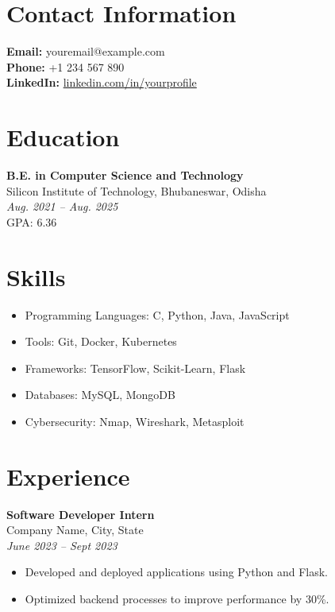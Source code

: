 \documentclass[a4paper,10pt]{article}
\begin{document}
\section*{Contact Information}
\noindent
\textbf{Email:} youremail@example.com \\
\textbf{Phone:} +1 234 567 890 \\
\textbf{LinkedIn:} \href{https://linkedin.com/in/yourprofile}{linkedin.com/in/yourprofile}

\section*{Education}
\noindent
\textbf{B.E. in Computer Science and Technology} \\
Silicon Institute of Technology, Bhubaneswar, Odisha \\
\textit{Aug. 2021 -- Aug. 2025} \\
GPA: 6.36

\section*{Skills}
\begin{itemize}[left=0pt]
    \item Programming Languages: C, Python, Java, JavaScript
    \item Tools: Git, Docker, Kubernetes
    \item Frameworks: TensorFlow, Scikit-Learn, Flask
    \item Databases: MySQL, MongoDB
    \item Cybersecurity: Nmap, Wireshark, Metasploit
\end{itemize}

\section*{Experience}
\noindent
\textbf{Software Developer Intern} \\
Company Name, City, State \\
\textit{June 2023 -- Sept 2023}
\begin{itemize}[left=0pt]
    \item Developed and deployed applications using Python and Flask.
    \item Optimized backend processes to improve performance by 30\%.
\end{itemize}
\end{document}
